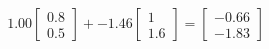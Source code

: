\documentclass[preview]{standalone}
\begin{document}
\begin{align*}
1.00 \begin{bmatrix} 0.8 \\ 0.5 \end{bmatrix} + -1.46 \begin{bmatrix} 1 \\ 1.6 \end{bmatrix} = \begin{bmatrix} -0.66 \\ -1.83 \end{bmatrix}
\end{align*}
\end{document}

